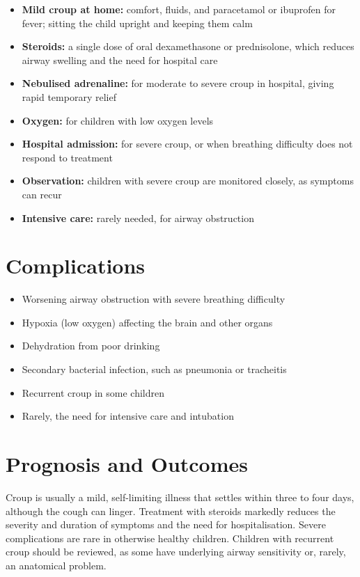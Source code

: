 \begin{itemize}
    \item \textbf{Mild croup at home:} comfort, fluids, and paracetamol or ibuprofen for fever; sitting the child upright and keeping them calm
    \item \textbf{Steroids:} a single dose of oral dexamethasone or prednisolone, which reduces airway swelling and the need for hospital care
    \item \textbf{Nebulised adrenaline:} for moderate to severe croup in hospital, giving rapid temporary relief
    \item \textbf{Oxygen:} for children with low oxygen levels
    \item \textbf{Hospital admission:} for severe croup, or when breathing difficulty does not respond to treatment
    \item \textbf{Observation:} children with severe croup are monitored closely, as symptoms can recur
    \item \textbf{Intensive care:} rarely needed, for airway obstruction
\end{itemize}

\section*{Complications}
\begin{itemize}
    \item Worsening airway obstruction with severe breathing difficulty
    \item Hypoxia (low oxygen) affecting the brain and other organs
    \item Dehydration from poor drinking
    \item Secondary bacterial infection, such as pneumonia or tracheitis
    \item Recurrent croup in some children
    \item Rarely, the need for intensive care and intubation
\end{itemize}

\section*{Prognosis and Outcomes}
Croup is usually a mild, self-limiting illness that settles within three to four days, although the cough can linger. Treatment with steroids markedly reduces the severity and duration of symptoms and the need for hospitalisation. Severe complications are rare in otherwise healthy children. Children with recurrent croup should be reviewed, as some have underlying airway sensitivity or, rarely, an anatomical problem.


